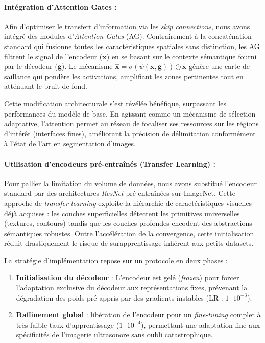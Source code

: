 \paragraph{Intégration d'Attention Gates :}

Afin d'optimiser le transfert d'information via les \textit{skip connections}, nous avons intégré des modules d'\textit{Attention Gates} (AG). Contrairement à la concaténation standard qui fusionne toutes les caractéristiques spatiales sans distinction, les AG filtrent le signal de l'encodeur ($\mathbf{x}$) en se basant sur le contexte sémantique fourni par le décodeur ($\mathbf{g}$). Le mécanisme $\hat{\mathbf{x}} = \sigma(\psi(\mathbf{x}, \mathbf{g})) \odot \mathbf{x}$ génère une carte de saillance qui pondère les activations, amplifiant les zones pertinentes tout en atténuant le bruit de fond.

Cette modification architecturale s'est révélée bénéfique, surpassant les performances du modèle de base. En agissant comme un mécanisme de sélection adaptative, l'attention permet au réseau de focaliser ses ressources sur les régions d'intérêt (interfaces fines), améliorant la précision de délimitation conformément à l'état de l'art en segmentation d'images.

\paragraph{Utilisation d'encodeurs pré-entraînés (Transfer Learning) :}

Pour pallier la limitation du volume de données, nous avons substitué l'encodeur standard par des architectures \textit{ResNet} pré-entraînées sur ImageNet. Cette approche de \textit{transfer learning} exploite la hiérarchie de caractéristiques visuelles déjà acquises : les couches superficielles détectent les primitives universelles (textures, contours) tandis que les couches profondes encodent des abstractions sémantiques robustes. Outre l'accélération de la convergence, cette initialisation réduit drastiquement le risque de surapprentissage inhérent aux petits datasets.

La stratégie d'implémentation repose sur un protocole en deux phases :
\begin{enumerate}
      \item \textbf{Initialisation du décodeur} : L'encodeur est gelé (\textit{frozen}) pour forcer l'adaptation exclusive du décodeur aux représentations fixes, prévenant la dégradation des poids pré-appris par des gradients instables (LR : $1\cdot10^{-3}$).
      \item \textbf{Raffinement global} : libération de l'encodeur pour un \textit{fine-tuning} complet à très faible taux d'apprentissage ($1\cdot10^{-4}$), permettant une adaptation fine aux spécificités de l'imagerie ultrasonore sans oubli catastrophique.
\end{enumerate}

